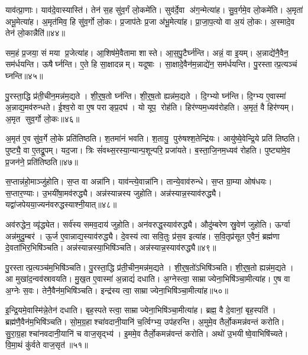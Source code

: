 याव॑त्प्रा॒णाः। याव॑दे॒वास्यास्ति॑। तेन॑ स॒ह सु॑व॒र्गं लो॒कमे॑ति। सुव॑र्दे॒वा अ॑ग॒न्मेत्या॑ह। सु॒व॒र्गमे॒व लो॒कमे॑ति। अ॒मृता॑ अभू॒मेत्या॑ह। अ॒मृत॑मिव॒ हि सु॑व॒र्गो लो॒कः। प्र॒जाप॑तेः प्र॒जा अ॑भू॒मेत्या॑ह। प्रा॒जा॒प॒त्यो वा अ॒यं लो॒कः। अ॒स्मादे॒व तेन॑ लो॒कान्नैति॑॥४४॥

सम॒हं प्र॒जया॒ सं मया प्र॒जेत्या॑ह। आ॒शिष॑मे॒वैतामा शास्ते। आ॒स॒पु॒टैर्घ्न॑न्ति। अन्नं॒ वा इ॒यम्। अ॒न्नाद्ये॑नै॒वैन॒ सम॑र्धयन्ति। ऊषैर्घ्नन्ति। ए॒ते हि सा॒क्षादन्नम्। यदूषाः। सा॒क्षादे॒वैन॑म॒न्नाद्ये॑न॒ सम॑र्धयन्ति। पु॒रस्तात्प्र॒त्यञ्चं घ्नन्ति॥४५॥

पु॒रस्ता॒द्धि प्र॑ती॒चीन॒मन्न॑म॒द्यते। शी॒र्॒ष॒तो घ्न॑न्ति। शी॒र्॒ष॒तो ह्यन्न॑म॒द्यते। दि॒ग्भ्यो घ्न॑न्ति। दि॒ग्भ्य ए॒वास्मा॑ अ॒न्नाद्य॒मव॑रुन्धते। ई॒श्व॒रो वा ए॒ष पराङ्प्र॒दघ॑। यो यूप॒ रोह॑ति। हिर॑ण्यम॒ध्यव॑रोहति। अ॒मृतं॒ वै हिर॑ण्यम्। अ॒मृत सुव॒र्गो लो॒कः॥४६॥

अ॒मृत॑ ए॒व सु॑व॒र्गे लो॒के प्रति॑तिष्ठति। श॒तमा॑नं भवति। श॒तायु॒ पुरु॑षश्श॒तेन्द्रि॑यः। आयु॑ष्ये॒वेन्द्रि॒ये प्रति॑ तिष्ठति। पुष्ट्यै॒ वा ए॒तद्रू॒पम्। यद॒जा। त्रिः सं॑वथ्स॒रस्या॒न्यान्प॒शून्परि॒ प्रजा॑यते। ब॒स्ता॒जि॒नम॒ध्यव॑ रोहति। पुष्ट्या॑मे॒व प्र॒जन॑ने॒ प्रति॑तिष्ठति॥४७॥\anuvakamend[प॒रि॒धा॒पय॑ति गो॒धूमा॑ जुहोति॒ स्वं नैति॑ प्र॒त्यञ्चं घ्नन्ति लो॒को नव॑ च]

स॒प्तान्न॑हो॒माञ्जु॑होति। स॒प्त वा अन्ना॑नि। याव॑न्त्ये॒वान्ना॑नि। तान्ये॒वाव॑रुन्धे। स॒प्त ग्रा॒म्या ओष॑धयः। स॒प्तार॒ण्याः। उ॒भयी॑षा॒मव॑रुद्ध्यै। अन्न॑स्यान्नस्य जुहोति। अन्न॑स्यान्न॒स्याव॑रुद्ध्यै। यद्वा॑जपेयया॒ज्यन॑वरुद्धस्याश्नी॒यात्॥४८॥

अव॑रुद्धेन॒ व्यृ॑द्ध्येत। सर्व॑स्य समव॒दाय॑ जुहोति। अन॑वरुद्ध॒स्याव॑रुद्ध्यै। औदु॑म्बरेण स्रु॒वेण॑ जुहोति। ऊर्ग्वा अन्न॑मुदु॒म्बर॑। ऊ॒र्ज ए॒वान्नाद्य॒स्याव॑रुद्ध्यै। दे॒वस्य॑ त्वा सवि॒तुः प्र॑स॒व इत्या॑ह। स॒वि॒तृप्र॑सूत ए॒वैनं॒ ब्रह्म॑णा दे॒वता॑भिर॒भिषि॑ञ्चति। अन्न॑स्यान्नस्या॒भिषि॑ञ्चति। अन्न॑स्यान्न॒स्याव॑रुद्ध्यै॥४९॥

पु॒रस्तात्प्र॒त्यञ्च॑म॒भिषि॑ञ्चति। पु॒रस्ता॒द्धि प्र॑ती॒चीन॒मन्न॑म॒द्यते। शी॒र्॒ष॒तो॑ऽभिषि॑ञ्चति। शी॒र्॒ष॒तो ह्यन्न॑म॒द्यते। आ मुखा॑द॒न्वव॑स्रावयति। मु॒ख॒त ए॒वास्मा॑ अ॒न्नाद्यं॑ दधाति। अ॒ग्नेस्त्वा॒ साम्राज्येना॒भिषि॑ञ्चा॒मीत्या॑ह। ए॒ष वा अ॒ग्नेः स॒वः। तेनै॒वैन॑म॒भिषि॑ञ्चति। इन्द्र॑स्य त्वा॒ साम्राज्येना॒भिषि॑ञ्चा॒मीत्या॑ह॥५०॥

इ॒न्द्रि॒यमे॒वास्मि॑न्ने॒तेन॑ दधाति। बृह॒स्पतेस्त्वा॒ साम्राज्येना॒भिषि॑ञ्चा॒मीत्या॑ह। ब्रह्म॒ वै दे॒वानां॒ बृह॒स्पति॑। ब्रह्म॑णै॒वैन॑म॒भिषि॑ञ्चति। सो॒म॒ग्र॒हाश्चा॑वदानी॒यानि॑ च॒र्त्विग्भ्य॒ उप॑हरन्ति। अ॒मुमे॒व तैर्लो॒कमन्न॑वन्तं करोति। सु॒रा॒ग्र॒हाश्चा॑नवदानी॒यानि॑ च वाज॒सृद्भ्य॑। इ॒ममे॒व तैर्लो॒कमन्न॑वन्तं करोति। अथो॑ उ॒भयीष्वे॒वाभिषि॑च्यते। वि॒मा॒थं कु॑र्वते वाज॒सृत॑॥५१॥

